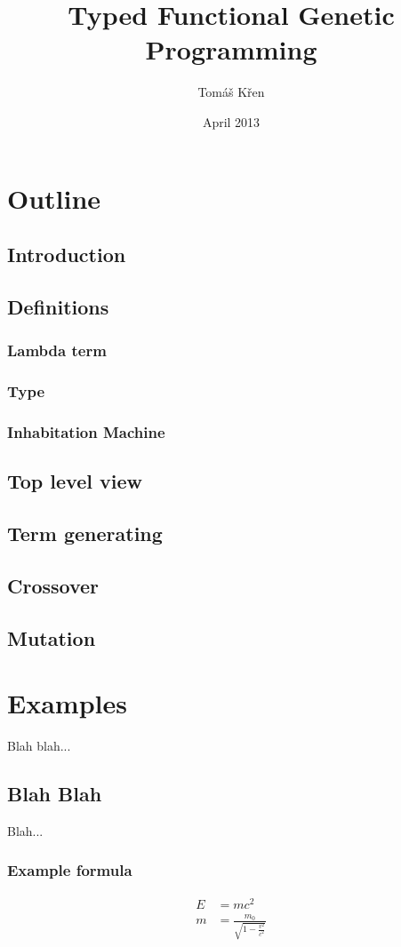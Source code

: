 \documentclass[12pt]{article}
\title{Typed Functional Genetic Programming}
\author{Tomáš Křen}
\date{April 2013}
\begin{document}
	\maketitle
	
	
	
	
	\section{Outline}
		\subsection{Introduction}
		\subsection{Definitions}
			\subsubsection{Lambda term}
			\subsubsection{Type}
			\subsubsection{Inhabitation Machine}
		\subsection{Top level view}
		\subsection{Term generating}
		\subsection{Crossover}
		\subsection{Mutation}
	
	\section{Examples}
	Blah blah...
	
	\subsection{Blah Blah}
	Blah...
	
	\subsubsection{Example formula}	
	
  	
  	\begin{align}
    	E &= mc^2                              \\
    	m &= \frac{m_0}{\sqrt{1-\frac{v^2}{c^2}}}
  	\end{align}
	
	
\end{document}
